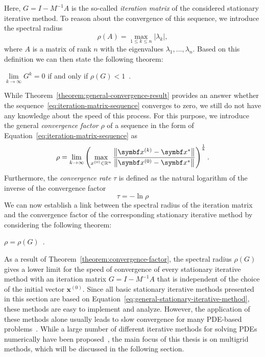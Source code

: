 Here, $G = I - M^{-1} A$ is the so-called \emph{iteration matrix} of the considered stationary iterative method.
To reason about the convergence of this sequence, we introduce the spectral radius 
\begin{equation}
	\rho (A)=\max \limits_{1 \leq k \leq n} |\lambda _{k}|,
\end{equation}
where $A$ is a matrix of rank $n$ with the eigenvalues $\lambda_{1}, \dots, \lambda_{n}$.
Based on this definition we can then state the following theorem:
\begin{theorem}
$\lim \limits_{k \to  \infty} G^k = 0$ if and only if $\rho(G) < 1$~\cite{varga1962iterative,saad2003iterative}.
\label{theorem:general-convergence-result}
\end{theorem}

While Theorem~\ref{theorem:general-convergence-result} provides an answer whether the sequence~\eqref{eq:iteration-matrix-sequence} converges to zero, we still do not have any knowledge about the speed of this process.
For this purpose, we introduce the general \emph{convergence factor} $\rho$ of a sequence in the form of Equation~\eqref{eq:iteration-matrix-sequence} as
\begin{equation}
	\rho = \lim \limits_{k \to  \infty} \left( \max \limits_{x^{(0)} \in \mathbb{R}^{n}} \frac{\norm{\bm{x}^{(k)} - \bm{x}^{*}}}{\norm{\bm{x}^{(0)} - \bm{x}^{*}}} \right)^{\frac{1}{k}}.
\end{equation} 
Furthermore, the \emph{convergence rate} $\tau$ is defined as the natural logarithm of the inverse of the convergence factor
\begin{equation}
	\tau = -\ln \rho
\end{equation}
We can now establish a link between the spectral radius of the iteration matrix and the convergence factor of the corresponding stationary iterative method by considering the following theorem:  
\begin{theorem}
	$\rho = \rho(G)$~\cite{varga1962iterative,saad2003iterative}.
	\label{theorem:convergence-factor}
\end{theorem}

As a result of Theorem~\ref{theorem:convergence-factor}, the spectral radius $\rho(G)$ gives a lower limit for the speed of convergence of every stationary iterative method with an iteration matrix $G = I - M^{-1} A$ that is independent of the choice of the initial vector $\bm{x}^{(0)}$.
Since all basic stationary iterative methods presented in this section are based on Equation~\eqref{eq:general-stationary-iterative-method}, these methods are easy to implement and analyze.
However, the application of these methods alone usually leads to slow convergence for many PDE-based problems~\cite{briggs2000multigrid}.
While a large number of different iterative methods for solving PDEs numerically have been proposed~\cite{saad2003iterative}, the main focus of this thesis is on multigrid methods, which will be discussed in the following section.


